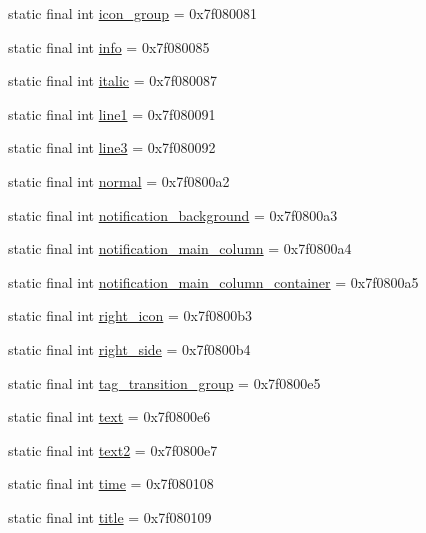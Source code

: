 \begin{DoxyCompactItemize}
static final int \mbox{\hyperlink{classandroid_1_1support_1_1compat_1_1_r_1_1id_ab7518ceedb40a91c3b51aa967e4d6080}{icon\+\_\+group}} = 0x7f080081
\item 
static final int \mbox{\hyperlink{classandroid_1_1support_1_1compat_1_1_r_1_1id_aba9a6330cdd716b1197d4e2dff77b8cc}{info}} = 0x7f080085
\item 
static final int \mbox{\hyperlink{classandroid_1_1support_1_1compat_1_1_r_1_1id_a121c693689b98271e68bd7d24f21873c}{italic}} = 0x7f080087
\item 
static final int \mbox{\hyperlink{classandroid_1_1support_1_1compat_1_1_r_1_1id_ac5f96e43158f2756f9fc5165b7b7d987}{line1}} = 0x7f080091
\item 
static final int \mbox{\hyperlink{classandroid_1_1support_1_1compat_1_1_r_1_1id_aecfcf837fde543ad55e8ce81157cfe29}{line3}} = 0x7f080092
\item 
static final int \mbox{\hyperlink{classandroid_1_1support_1_1compat_1_1_r_1_1id_a65c33f5c2190f8ca54d7c6ad8dc97aca}{normal}} = 0x7f0800a2
\item 
static final int \mbox{\hyperlink{classandroid_1_1support_1_1compat_1_1_r_1_1id_a188296acd11bfd9ef77df736bb6891a6}{notification\+\_\+background}} = 0x7f0800a3
\item 
static final int \mbox{\hyperlink{classandroid_1_1support_1_1compat_1_1_r_1_1id_ae8e8ad179b7f5ae9da1f77bf0b8eeb7c}{notification\+\_\+main\+\_\+column}} = 0x7f0800a4
\item 
static final int \mbox{\hyperlink{classandroid_1_1support_1_1compat_1_1_r_1_1id_a7066e94509a510ef1b402ba47de5616b}{notification\+\_\+main\+\_\+column\+\_\+container}} = 0x7f0800a5
\item 
static final int \mbox{\hyperlink{classandroid_1_1support_1_1compat_1_1_r_1_1id_a396b266b51c52c0f16da9cf86d84d376}{right\+\_\+icon}} = 0x7f0800b3
\item 
static final int \mbox{\hyperlink{classandroid_1_1support_1_1compat_1_1_r_1_1id_a49a4d81eee0abbdc92ed7ab14bf629bb}{right\+\_\+side}} = 0x7f0800b4
\item 
static final int \mbox{\hyperlink{classandroid_1_1support_1_1compat_1_1_r_1_1id_a61bed857fa277142248305f44d3f9180}{tag\+\_\+transition\+\_\+group}} = 0x7f0800e5
\item 
static final int \mbox{\hyperlink{classandroid_1_1support_1_1compat_1_1_r_1_1id_a3a8294276a843c8ecf9d1de55c381379}{text}} = 0x7f0800e6
\item 
static final int \mbox{\hyperlink{classandroid_1_1support_1_1compat_1_1_r_1_1id_a0b3bf5562d8100ff478806cbbad4d21d}{text2}} = 0x7f0800e7
\item 
static final int \mbox{\hyperlink{classandroid_1_1support_1_1compat_1_1_r_1_1id_a49cf2219fd53fac400ba97ac46a60f87}{time}} = 0x7f080108
\item 
static final int \mbox{\hyperlink{classandroid_1_1support_1_1compat_1_1_r_1_1id_a40ae774b3537286b4a997e8cbb09e476}{title}} = 0x7f080109
\end{DoxyCompactItemize}
